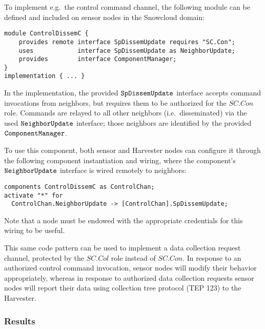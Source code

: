 To implement e.g.~the control command channel, the following module can be defined and included
on sensor nodes in the Snowcloud domain:

\singlespace
\vspace{1.0ex}
\begin{lstlisting}[language=nesC]
module ControlDissemC {
    provides remote interface SpDissemUpdate requires "SC.Con";
    uses            interface SpDissemUpdate as NeighborUpdate;
    provides        interface ComponentManager;
}
implementation { ... }
\end{lstlisting}
\vspace{1.0ex}
\primaryspacing

In the implementation, the provided $\verb+SpDissemUpdate+$ interface accepts command
invocations from neighbors, but requires them to be authorized for the $\mathit{SC.Con}$ role.
Commands are relayed to all other neighbors (i.e.~disseminated) via the used
$\verb+NeighborUpdate+$ interface; those neighbors are identified by the provided
$\verb+ComponentManager+$.

To use this component, both sensor and Harvester nodes can configure it through the following
component instantiation and wiring, where the component's $\verb+NeighborUpdate+$ interface is
wired remotely to neighbors:

\singlespace
\vspace{1.0ex}
\begin{lstlisting}[language=nesC]
components ControlDissemC as ControlChan;
activate "*" for 
  ControlChan.NeighborUpdate -> [ControlChan].SpDissemUpdate;
\end{lstlisting}
\vspace{1.0ex}
\primaryspacing

Note that a node must be endowed with the appropriate credentials for this wiring to be useful.

This same code pattern can be used to implement a data collection request channel, protected by
the $\mathit{SC.Col}$ role instead of $\mathit{SC.Con}$. In response to an authorized control
command invocation, sensor nodes will modify their behavior appropriately, whereas in response
to authorized data collection requests sensor nodes will report their data using collection tree
protocol (TEP 123) to the Harvester.

\subsubsection{Results}

